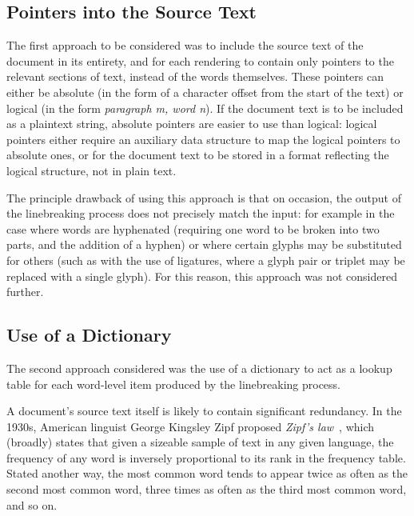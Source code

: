 \subsection{Pointers into the Source Text}
The first approach to be considered was to include the source text of the document in its entirety, and for each rendering to contain only pointers to the relevant sections of text, instead of the words themselves. These pointers can either be absolute (in the form of a character offset from the start of the text) or logical (in the form \emph{paragraph m, word n}). If the document text is to be included as a plaintext string, absolute pointers are easier to use than logical: logical pointers either require an auxiliary data structure to map the logical pointers to absolute ones, or for the document text to be stored in a format reflecting the logical structure, \ie{} not in plain text.

The principle drawback of using this approach is that on occasion, the output of the linebreaking process does not precisely match the input: for example in the case where words are hyphenated (requiring one word to be broken into two parts, and the addition of a hyphen) or where certain glyphs may be substituted for others (such as with the use of ligatures, where a glyph pair or triplet may be replaced with a single glyph). For this reason, this approach was not considered further.


\subsection{Use of a Dictionary}
\label{sec:dictionary}
The second approach considered was the use of a dictionary to act as a lookup table for each word-level item produced by the linebreaking process.

A document's source text itself is likely to contain significant redundancy. In the 1930s, American linguist George Kingsley Zipf proposed \emph{Zipf's law}~\cite{zipf1932}, which (broadly) states that given a sizeable sample of text in any given language, the frequency of any word is inversely proportional to its rank in the frequency table. Stated another way, the most common word tends to appear twice as often as the second most common word, three times as often as the third most common word, and so on.

